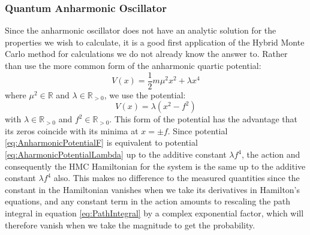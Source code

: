 \documentclass[12pt]{article}
\begin{document}
        \subsubsection{Quantum Anharmonic Oscillator}
            Since the anharmonic oscillator does not have an analytic solution for the properties we wish to calculate, it is a good first application of the Hybrid Monte Carlo method for calculations we do not already know the answer to. Rather than use the more common form of the anharmonic quartic potential:
            \begin{equation}
                \label{eq:AharmonicPotentialLambda}
                V\left(x\right) = \frac{1}{2}m\mu^2x^2+\lambda x^4
            \end{equation}
            where $\mu^2 \in\mathbb{R}$ and $\lambda\in\mathbb{R}_{>0}$, we use the potential:
            \begin{equation}
                \label{eq:AnharmonicPotentialF}
                V\left(x\right) = \lambda\left(x^2-f^2\right)
            \end{equation}
            with $\lambda\in\mathbb{R}_{>0}$ and $f^2\in\mathbb{R}_{>0}$. This form of the potential has the advantage that its zeros coincide with its minima at $x=\pm f$. Since potential \ref{eq:AnharmonicPotentialF} is equivalent to potential \ref{eq:AharmonicPotentialLambda} up to the additive constant $\lambda f^4$, the action and consequently the HMC Hamiltonian for the system is the same up to the additive constant $\lambda f^4$ also. This makes no difference to the measured quantities since the constant in the Hamiltonian vanishes when we take its derivatives in Hamilton's equations, and any constant term in the action amounts to rescaling the path integral in equation \ref{eq:PathIntegral} by a complex exponential factor, which will therefore vanish when we take the magnitude to get the probability.
\end{document}
